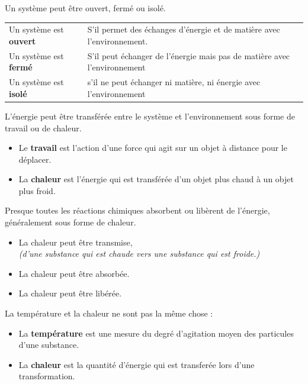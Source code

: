 \documentclass[
  11pt,
  a4paper,
  openany]{book}
\providecommand{\tightlist}{%
  \setlength{\itemsep}{0pt}\setlength{\parskip}{0pt}}
\begin{document}
Un système peut être ouvert, fermé ou isolé.

\begin{longtable}[]{@{}
  >{\raggedright\arraybackslash}p{}
  >{\raggedright\arraybackslash}p{}@{}}
\toprule\noalign{}
\endhead
\bottomrule\noalign{}
\endlastfoot
Un système est \textbf{ouvert} & S'il permet des échanges d'énergie et de matière avec l'environnement. \\
Un système est \textbf{fermé} & S'il peut échanger de l'énergie mais pas de matière avec l'environnement \\
Un système est \textbf{isolé} & s'il ne peut échanger ni matière, ni énergie avec l'environnement \\
\end{longtable}

L'énergie peut être transférée entre le système et l'environnement sous forme de travail ou de chaleur.

\begin{itemize}
\tightlist
\item
  Le \textbf{travail} est l'action d'une force qui agit sur un objet à distance pour le déplacer.
\item
  La \textbf{chaleur} est l'énergie qui est transférée d'un objet plus chaud à un objet plus froid.
\end{itemize}

Presque toutes les réactions chimiques absorbent ou libèrent de l'énergie, généralement sous forme de chaleur.

\begin{itemize}
\tightlist
\item
  La chaleur peut être transmise,\\
  \emph{(d'une substance qui est chaude vers une substance qui est froide.)}
\item
  La chaleur peut être absorbée.
\item
  La chaleur peut être libérée.
\end{itemize}

La température et la chaleur ne sont pas la même chose :

\begin{itemize}
\tightlist
\item
  La \textbf{température} est une mesure du degré d'agitation moyen des particules d'une substance.
\item
  La \textbf{chaleur} est la quantité d'énergie qui est transferée lors d'une transformation.
\end{itemize}
\end{document}
